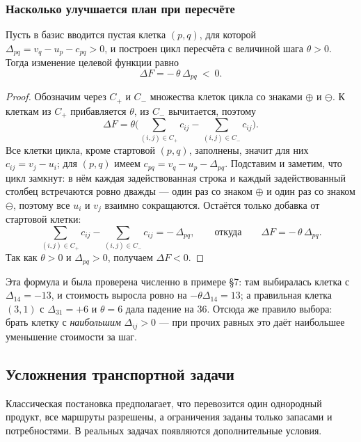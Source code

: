 \subsubsection*{Насколько улучшается план при пересчёте}

\begin{theorem}\label{thm:potentials-improve}
Пусть в базис вводится пустая клетка $(p,q)$, для которой
$\Delta_{pq} = v_q - u_p - c_{pq} > 0$, и построен цикл пересчёта с величиной
шага $\theta > 0$. Тогда изменение целевой функции равно
\[
  \Delta F = -\,\theta\, \Delta_{pq} \ <\ 0 .
\]
\end{theorem}

\begin{proof}
Обозначим через $C_+$ и $C_-$ множества клеток цикла со знаками $\oplus$ и
$\ominus$. К клеткам из $C_+$ прибавляется $\theta$, из $C_-$ вычитается,
поэтому
\[
  \Delta F = \theta \Big( \sum_{(i,j) \in C_+} c_{ij}
                        - \sum_{(i,j) \in C_-} c_{ij} \Big) .
\]
Все клетки цикла, кроме стартовой $(p,q)$, заполнены, значит для них
$c_{ij} = v_j - u_i$; для $(p,q)$ имеем
$c_{pq} = v_q - u_p - \Delta_{pq}$. Подставим и заметим, что цикл замкнут: в
нём каждая задействованная строка и каждый задействованный столбец встречаются
ровно дважды — один раз со знаком $\oplus$ и один раз со знаком $\ominus$,
поэтому все $u_i$ и $v_j$ взаимно сокращаются. Остаётся только добавка от
стартовой клетки:
\[
  \sum_{(i,j)\in C_+} c_{ij} - \sum_{(i,j)\in C_-} c_{ij} = -\,\Delta_{pq} ,
  \qquad\text{откуда}\qquad
  \Delta F = -\,\theta\,\Delta_{pq} .
\]
Так как $\theta > 0$ и $\Delta_{pq} > 0$, получаем $\Delta F < 0$.
\end{proof}

\begin{idea}
Эта формула и была проверена численно в примере §7: там выбиралась клетка с
$\Delta_{14} = -13$, и стоимость выросла ровно на
$-\theta\Delta_{14} = 13$; а правильная клетка $(3,1)$ с $\Delta_{31} = +6$ и
$\theta = 6$ дала падение на $36$. Отсюда же правило выбора: брать клетку с
\emph{наибольшим} $\Delta_{ij} > 0$ — при прочих равных это даёт наибольшее
уменьшение стоимости за шаг.
\end{idea}

\subsection{Усложнения транспортной задачи}
\label{subsec:transport-extensions}

Классическая постановка предполагает, что перевозится один однородный продукт,
все маршруты разрешены, а ограничения заданы только запасами и потребностями.
В реальных задачах появляются дополнительные условия.

